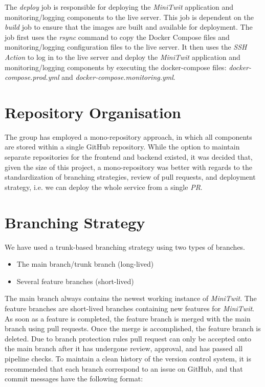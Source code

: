The \textit{deploy} job is responsible for deploying the \textit{MiniTwit} application and monitoring/logging components to the live server. This job is dependent on the \textit{build} job to ensure that the images are built and available for deployment. The job first uses the \textit{rsync} command to copy the Docker Compose files and monitoring/logging configuration files to the live server. It then uses the \textit{SSH Action} to log in to the live server and deploy the \textit{MiniTwit} application and monitoring/logging components by executing the docker-compose files: \textit{docker-compose.prod.yml} and \textit{docker-compose.monitoring.yml}.

\section{Repository Organisation}

The group has employed a mono-repository approach, in which all components are stored within a single GitHub repository. While the option to maintain separate repositories for the frontend and backend existed, it was decided that, given the size of this project, a mono-repository was better with regards to the standardization of branching strategies, review of pull requests, and deployment strategy, i.e. we can deploy the whole service from a single \textit{PR}.

\section{Branching Strategy}

We have used a trunk-based branching strategy using two types of branches.

\begin{itemize}
    \item The main branch/trunk branch (long-lived)
    \item Several feature branches (short-lived)
\end{itemize}

The main branch always contains the newest working instance of \textit{MiniTwit}. The feature branches are short-lived branches containing new features for \textit{MiniTwit}. As soon as a feature is completed, the feature branch is merged with the main branch using pull requests. Once the merge is accomplished, the feature branch is deleted. Due to branch protection rules pull request can only be accepted onto the main branch after it has undergone review, approval, and has passed all pipeline checks. To maintain a clean history of the version control system, it is recommended that each branch correspond to an issue on GitHub, and that commit messages have the following format:

